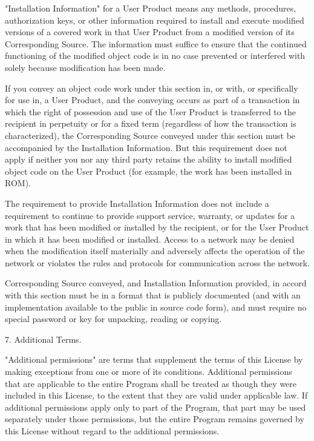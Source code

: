 \documentclass[11pt]{book}
\begin{document}
    "Installation Information" for a User Product means any methods,
    procedures, authorization keys, or other information required to install
    and execute modified versions of a covered work in that User Product from
    a modified version of its Corresponding Source.  The information must
    suffice to ensure that the continued functioning of the modified object
    code is in no case prevented or interfered with solely because
    modification has been made.

    If you convey an object code work under this section in, or with, or
    specifically for use in, a User Product, and the conveying occurs as
    part of a transaction in which the right of possession and use of the
    User Product is transferred to the recipient in perpetuity or for a
    fixed term (regardless of how the transaction is characterized), the
    Corresponding Source conveyed under this section must be accompanied
    by the Installation Information.  But this requirement does not apply
    if neither you nor any third party retains the ability to install
    modified object code on the User Product (for example, the work has
    been installed in ROM).

    The requirement to provide Installation Information does not include a
    requirement to continue to provide support service, warranty, or updates
    for a work that has been modified or installed by the recipient, or for
    the User Product in which it has been modified or installed.  Access to a
    network may be denied when the modification itself materially and
    adversely affects the operation of the network or violates the rules and
    protocols for communication across the network.

    Corresponding Source conveyed, and Installation Information provided,
    in accord with this section must be in a format that is publicly
    documented (and with an implementation available to the public in
    source code form), and must require no special password or key for
    unpacking, reading or copying.

    7. Additional Terms.

    "Additional permissions" are terms that supplement the terms of this
    License by making exceptions from one or more of its conditions.
    Additional permissions that are applicable to the entire Program shall
    be treated as though they were included in this License, to the extent
    that they are valid under applicable law.  If additional permissions
    apply only to part of the Program, that part may be used separately
    under those permissions, but the entire Program remains governed by
    this License without regard to the additional permissions.
\end{document}
